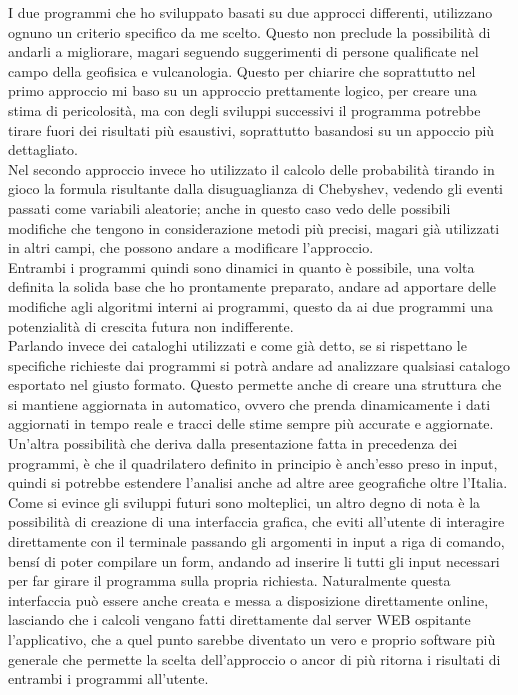 I due programmi che ho sviluppato basati su due approcci differenti, utilizzano ognuno un criterio specifico da me scelto. Questo non preclude la possibilit\`a di andarli a migliorare, magari seguendo suggerimenti di persone qualificate nel campo della geofisica e vulcanologia. Questo per chiarire che soprattutto nel primo approccio mi baso su un approccio prettamente logico, per creare una stima di pericolosit\`a, ma con degli sviluppi successivi il programma potrebbe tirare fuori dei risultati pi\`u esaustivi, soprattutto basandosi su un appoccio pi\`u dettagliato.\\
Nel secondo approccio invece ho utilizzato il calcolo delle probabilit\`a tirando in gioco la formula risultante dalla disuguaglianza di Chebyshev, vedendo gli eventi passati come variabili aleatorie; anche in questo caso vedo delle possibili modifiche che tengono in considerazione metodi pi\`u precisi, magari gi\`a utilizzati in altri campi, che possono andare a modificare l'approccio.\\
Entrambi i programmi quindi sono dinamici in quanto \`e possibile, una volta definita la solida base che ho prontamente preparato, andare ad apportare delle modifiche agli algoritmi interni ai programmi, questo da ai due programmi una potenzialit\`a di crescita futura non indifferente.\\
Parlando invece dei cataloghi utilizzati e come gi\`a detto, se si rispettano le specifiche richieste dai programmi si potr\`a andare ad analizzare qualsiasi catalogo esportato nel giusto formato. Questo permette anche di creare una struttura che si mantiene aggiornata in automatico, ovvero che prenda dinamicamente i dati aggiornati in tempo reale e tracci delle stime sempre pi\`u accurate e aggiornate.\\
Un'altra possibilit\`a che deriva dalla presentazione fatta in precedenza dei programmi, \`e che il quadrilatero definito in principio \`e anch'esso preso in input, quindi si potrebbe estendere l'analisi anche ad altre aree geografiche oltre l'Italia.\\
Come si evince gli sviluppi futuri sono molteplici, un altro degno di nota \`e la possibilit\`a di creazione di una interfaccia grafica, che eviti all'utente di interagire direttamente con il terminale passando gli argomenti in input a riga di comando, bens\'i di poter compilare un form, andando ad inserire li tutti gli input necessari per far girare il programma sulla propria richiesta. Naturalmente questa interfaccia pu\`o essere anche creata e messa a disposizione direttamente online, lasciando che i calcoli vengano fatti direttamente dal server WEB ospitante l'applicativo, che a quel punto sarebbe diventato un vero e proprio software pi\`u generale che permette la scelta dell'approccio o ancor di pi\`u ritorna i risultati di entrambi i programmi all'utente.